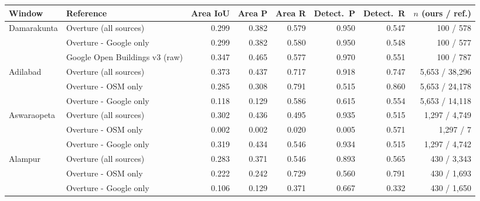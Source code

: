 \begin{tabular}{llrrrrrr}
\hline
Window & Reference & Area IoU & Area P & Area R & Detect.\ P & Detect.\ R & $n$ (ours / ref.) \\
\hline
Damarakunta & Overture (all sources) & 0.299 & 0.382 & 0.579 & 0.950 & 0.547 & 100 / 578 \\
 & Overture - Google only & 0.299 & 0.382 & 0.580 & 0.950 & 0.548 & 100 / 577 \\
 & Google Open Buildings v3 (raw) & 0.347 & 0.465 & 0.577 & 0.970 & 0.551 & 100 / 787 \\
\hline
Adilabad & Overture (all sources) & 0.373 & 0.437 & 0.717 & 0.918 & 0.747 & 5,653 / 38,296 \\
 & Overture - OSM only & 0.285 & 0.308 & 0.791 & 0.515 & 0.860 & 5,653 / 24,178 \\
 & Overture - Google only & 0.118 & 0.129 & 0.586 & 0.615 & 0.554 & 5,653 / 14,118 \\
\hline
Aswaraopeta & Overture (all sources) & 0.302 & 0.436 & 0.495 & 0.935 & 0.515 & 1,297 / 4,749 \\
 & Overture - OSM only & 0.002 & 0.002 & 0.020 & 0.005 & 0.571 & 1,297 / 7 \\
 & Overture - Google only & 0.319 & 0.434 & 0.546 & 0.934 & 0.515 & 1,297 / 4,742 \\
\hline
Alampur & Overture (all sources) & 0.283 & 0.371 & 0.546 & 0.893 & 0.565 & 430 / 3,343 \\
 & Overture - OSM only & 0.222 & 0.242 & 0.729 & 0.560 & 0.791 & 430 / 1,693 \\
 & Overture - Google only & 0.106 & 0.129 & 0.371 & 0.667 & 0.332 & 430 / 1,650 \\
\hline
\end{tabular}
